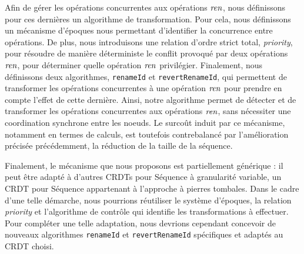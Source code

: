 Afin de gérer les opérations concurrentes aux opérations $\mathit{ren}$, nous définissons pour ces dernières un algorithme de transformation.
Pour cela, nous définissons un mécanisme d'époques nous permettant d'identifier la concurrence entre opérations.
De plus, nous introduisons une relation d'ordre strict total, \emph{priority}, pour résoudre de manière déterministe le conflit provoqué par deux opérations $\mathit{ren}$, \ie pour déterminer quelle opération $\mathit{ren}$ privilégier.
Finalement, nous définissons deux algorithmes, \texttt{renameId} et \texttt{revertRenameId}, qui permettent de transformer les opérations concurrentes à une opération $\mathit{ren}$ pour prendre en compte l'effet de cette dernière.
Ainsi, notre algorithme permet de détecter et de transformer les opérations concurrentes aux opérations $\mathit{ren}$, sans nécessiter une coordination synchrone entre les noeuds.
Le surcoût induit par ce mécanisme, notamment en termes de calculs, est toutefois contrebalancé par l'amélioration précisée précédemment, \ie la réduction de la taille de la séquence.

Finalement, le mécanisme que nous proposons est partiellement générique : il peut être adapté à d'autres \acp{CRDT} pour Séquence à granularité variable, \eg un \ac{CRDT} pour Séquence appartenant à l'approche à pierres tombales.
Dans le cadre d'une telle démarche, nous pourrions réutiliser le système d'époques, la relation \emph{priority} et l'algorithme de contrôle qui identifie les transformations à effectuer.
Pour compléter une telle adaptation, nous devrions cependant concevoir de nouveaux algorithmes \texttt{renameId} et \texttt{revertRenameId} spécifiques et adaptés au \ac{CRDT} choisi.

